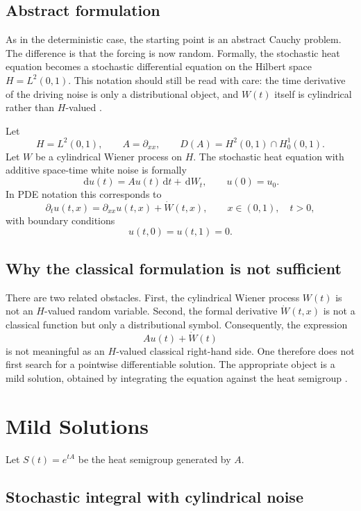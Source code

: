 \documentclass[11pt,a4paper]{article}
\newcommand{\dd}{\,\mathrm{d}}
\newcommand{\dom}{D}
\begin{document}
\subsection{Abstract formulation}

As in the deterministic case, the starting point is an abstract Cauchy problem.
The difference is that the forcing is now random. Formally, the stochastic heat
equation becomes a stochastic differential equation on the Hilbert space
\(H=L^2(0,1)\). This notation should still be read with care: the time
derivative of the driving noise is only a distributional object, and \(W(t)\)
itself is cylindrical rather than \(H\)-valued \cite{delSarto2025,hairer2009}.

Let
\[
  H=L^2(0,1),
  \qquad
  A=\partial_{xx},
  \qquad
  \dom(A)=H^2(0,1)\cap H_0^1(0,1).
\]
Let \(W\) be a cylindrical Wiener process on \(H\). The stochastic heat equation
with additive space-time white noise is formally
\[
  \dd u(t)=Au(t)\dd t+\dd W_t,
  \qquad u(0)=u_0.
\]
In PDE notation this corresponds to
\[
  \partial_t u(t,x)=\partial_{xx}u(t,x)+\dot W(t,x),
  \qquad x\in(0,1),\quad t>0,
\]
with boundary conditions
\[
  u(t,0)=u(t,1)=0.
\]

\subsection{Why the classical formulation is not sufficient}

There are two related obstacles. First, the cylindrical Wiener process \(W(t)\)
is not an \(H\)-valued random variable. Second, the formal derivative
\(\dot W(t,x)\) is not a classical function but only a distributional symbol.
Consequently, the expression
\[
  Au(t)+\dot W(t)
\]
is not meaningful as an \(H\)-valued classical right-hand side. One therefore
does not first search for a pointwise differentiable solution. The appropriate
object is a mild solution, obtained by integrating the equation against the heat
semigroup \cite{delSarto2025,daPratoZabczyk}.

\section{Mild Solutions}

Let \(S(t)=e^{tA}\) be the heat semigroup generated by \(A\).

\subsection{Stochastic integral with cylindrical noise}
\end{document}
